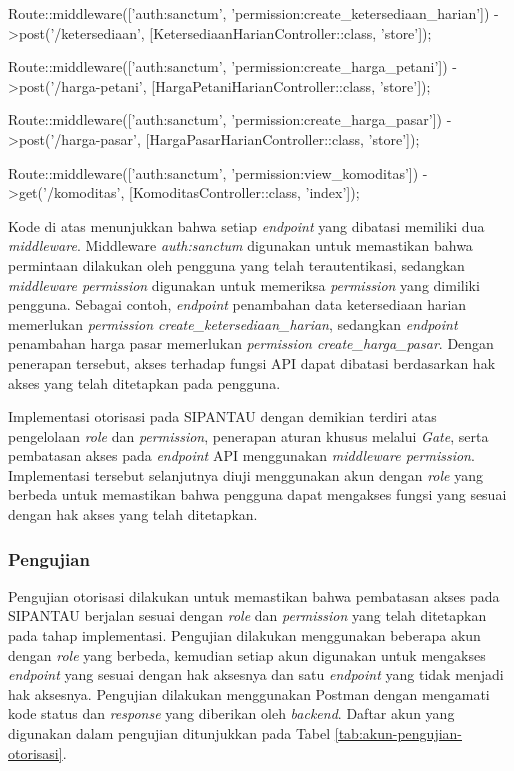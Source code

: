 \begin{code}
\begin{ignasicblock}
Route::middleware(['auth:sanctum', 'permission:create_ketersediaan_harian'])
    ->post('/ketersediaan', [KetersediaanHarianController::class, 'store']);

Route::middleware(['auth:sanctum', 'permission:create_harga_petani'])
    ->post('/harga-petani', [HargaPetaniHarianController::class, 'store']);

Route::middleware(['auth:sanctum', 'permission:create_harga_pasar'])
    ->post('/harga-pasar', [HargaPasarHarianController::class, 'store']);

Route::middleware(['auth:sanctum', 'permission:view_komoditas'])
    ->get('/komoditas', [KomoditasController::class, 'index']);
\end{ignasicblock}
\end{code}

Kode di atas menunjukkan bahwa setiap \textit{endpoint} yang dibatasi memiliki dua \textit{middleware}. Middleware \textit{auth:sanctum} digunakan untuk memastikan bahwa permintaan dilakukan oleh pengguna yang telah terautentikasi, sedangkan \textit{middleware permission} digunakan untuk memeriksa \textit{permission} yang dimiliki pengguna. Sebagai contoh, \textit{endpoint} penambahan data ketersediaan harian memerlukan \textit{permission create\_ketersediaan\_harian}, sedangkan \textit{endpoint} penambahan harga pasar memerlukan \textit{permission create\_harga\_pasar}. Dengan penerapan tersebut, akses terhadap fungsi API dapat dibatasi berdasarkan hak akses yang telah ditetapkan pada pengguna.

Implementasi otorisasi pada SIPANTAU dengan demikian terdiri atas pengelolaan \textit{role} dan \textit{permission}, penerapan aturan khusus melalui \textit{Gate}, serta pembatasan akses pada \textit{endpoint} API menggunakan \textit{middleware permission}. Implementasi tersebut selanjutnya diuji menggunakan akun dengan \textit{role} yang berbeda untuk memastikan bahwa pengguna dapat mengakses fungsi yang sesuai dengan hak akses yang telah ditetapkan.

\subsubsection{Pengujian}

Pengujian otorisasi dilakukan untuk memastikan bahwa pembatasan akses pada SIPANTAU berjalan sesuai dengan \textit{role} dan \textit{permission} yang telah ditetapkan pada tahap implementasi. Pengujian dilakukan menggunakan beberapa akun dengan \textit{role} yang berbeda, kemudian setiap akun digunakan untuk mengakses \textit{endpoint} yang sesuai dengan hak aksesnya dan satu \textit{endpoint} yang tidak menjadi hak aksesnya. Pengujian dilakukan menggunakan Postman dengan mengamati kode status dan \textit{response} yang diberikan oleh \textit{backend}. Daftar akun yang digunakan dalam pengujian ditunjukkan pada Tabel \ref{tab:akun-pengujian-otorisasi}.

